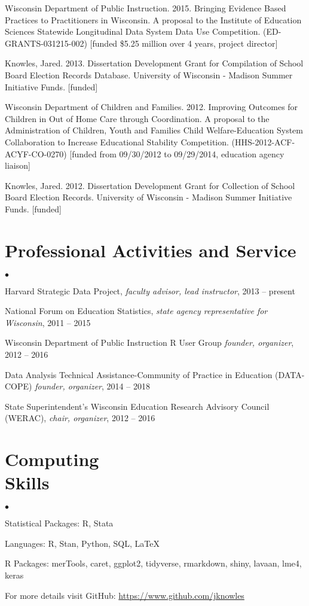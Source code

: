 \documentclass[margin,line]{res}
\newenvironment{list2}{
  \begin{list}{$\bullet$}{%
      \setlength{\itemsep}{0in}
      \setlength{\parsep}{0in} \setlength{\parskip}{0in}
      \setlength{\topsep}{0in} \setlength{\partopsep}{0in} 
      \setlength{\leftmargin}{0.2in}}}{\end{list}}
\begin{document}
\begin{resume}
Wisconsin Department of Public Instruction. 2015. Bringing Evidence Based 
Practices to Practitioners in Wisconsin. A proposal to the Institute of Education 
Sciences Statewide Longitudinal Data System Data Use Competition. (ED-GRANTS-031215-002) 
[funded \$5.25 million over 4 years, project director]

Knowles, Jared. 2013. Dissertation Development Grant for Compilation of School Board Election Records Database. University of Wisconsin - Madison Summer Initiative Funds. [funded]

Wisconsin Department of Children and Families. 2012. Improving Outcomes for Children in Out of Home Care through Coordination. A proposal to the Administration of Children, Youth and Families 
 Child Welfare-Education System Collaboration to Increase Educational Stability Competition. (HHS-2012-ACF-ACYF-CO-0270) [funded from 09/30/2012 to 09/29/2014, education agency liaison]

Knowles, Jared. 2012. Dissertation Development Grant for Collection of School Board Election Records. University of Wisconsin - Madison Summer Initiative Funds. [funded]


\section{\sc Professional Activities and Service}

\begin{list2}
\item Harvard Strategic Data Project, \emph{faculty advisor, lead instructor}, 2013 -- present
\item National Forum on Education Statistics, \emph{state agency representative for Wisconsin}, 
2011 -- 2015
\item Wisconsin Department of Public Instruction R User Group \emph{founder, organizer}, 
2012 -- 2016 
\item Data Analysis Technical Assistance-Community of Practice in Education 
(DATA-COPE) \emph{founder, organizer}, 2014 -- 2018
\item State Superintendent's Wisconsin Education Research Advisory Council (WERAC), 
\emph{chair, organizer}, 2012 -- 2016
\end{list2}
 
\section{\sc Computing \\ Skills} 
\begin{list2}
\item Statistical Packages: R, Stata
\item Languages:  R, Stan, Python, SQL, \LaTeX
\item R Packages: merTools, caret, ggplot2, tidyverse, rmarkdown, shiny, lavaan, lme4, keras
\item For more details visit GitHub: \url{https://www.github.com/jknowles}\\
\end{list2}


\end{resume}
\end{document}
